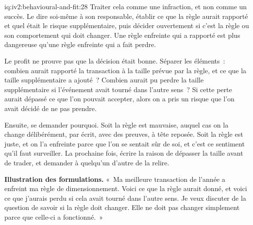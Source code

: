 \begin{solution}{iq:iv2:behavioural-and-fit:28}
Traiter cela comme une infraction, et non comme un succès. Le dire soi-même à son responsable, établir ce que la règle aurait rapporté et quel était le risque supplémentaire, puis décider ouvertement si c'est la règle ou son comportement qui doit changer. Une règle enfreinte qui a rapporté est plus dangereuse qu'une règle enfreinte qui a fait perdre.

Le profit ne prouve pas que la décision était bonne. Séparer les éléments~: combien aurait rapporté la transaction à la taille prévue par la règle, et ce que la taille supplémentaire a ajouté~? Combien aurait pu perdre la taille supplémentaire si l'événement avait tourné dans l'autre sens~? Si cette perte aurait dépassé ce que l'on pouvait accepter, alors on a pris un risque que l'on avait décidé de ne pas prendre.

Ensuite, se demander pourquoi. Soit la règle est mauvaise, auquel cas on la change délibérément, par écrit, avec des preuves, à tête reposée. Soit la règle est juste, et on l'a enfreinte parce que l'on se sentait sûr de soi, et c'est ce sentiment qu'il faut surveiller. La prochaine fois, écrire la raison de dépasser la taille avant de trader, et demander à quelqu'un d'autre de la relire.

\textbf{Illustration des formulations.} «~Ma meilleure transaction de l'année a enfreint ma règle de dimensionnement. Voici ce que la règle aurait donné, et voici ce que j'aurais perdu si cela avait tourné dans l'autre sens. Je veux discuter de la question de savoir si la règle doit changer. Elle ne doit pas changer simplement parce que celle-ci a fonctionné.~»

\end{solution}

